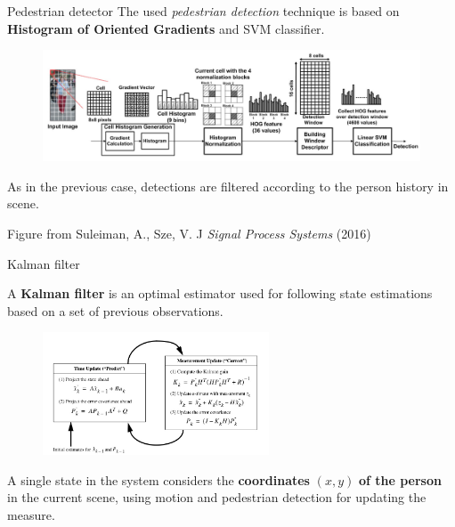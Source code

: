 \documentclass{beamer}
\begin{document}
\begin{tframe}{Pedestrian detector}
The used \emph{pedestrian detection} technique is based on \textbf{Histogram of Oriented Gradients} and SVM classifier.

\begin{figure}[h]
\centering
\includegraphics[width=1\textwidth]{images/hog_detector.jpg}
\end{figure}

As in the previous case, detections are filtered according to the person history in scene.

\vspace{0.2cm}
\hfill {\tiny Figure from Suleiman, A., Sze, V. J \emph{Signal Process Systems} (2016)}
\end{tframe}


\begin{tframe}{Kalman filter}

A \textbf{Kalman filter} is an optimal estimator used for following state estimations based on a set of previous observations.
\begin{figure}[h]
\centering
\includegraphics[width=0.6\textwidth]{images/kalmaneq.jpg}
\end{figure}
A single state in the system considers the \textbf{coordinates} $(x, y)$ \textbf{of the person} in the current scene, using motion and pedestrian detection for updating the measure.
\end{tframe}
\end{document}
